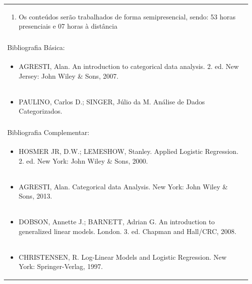 \documentclass[11pt]{article}
\begin{document}
\begin{center}
\begin{longtable}{|p{4cm}|p{4cm}|p{4cm}|p{4cm}|}
\multicolumn{4}{|p{\dimexpr 16cm + 6\tabcolsep\relax}|}{\begin{enumerate}[start=7]\item Os conteúdos serão trabalhados de forma semipresencial, sendo: 53 horas presenciais e 07 horas à distância\end{enumerate}}\\
\multicolumn{4}{|p{\dimexpr 16cm + 6\tabcolsep\relax}|}{}\\
\hline
\multicolumn{4}{|p{16cm}|}{Bibliografia Básica:}\\*
\multicolumn{4}{|p{\dimexpr 16cm + 6\tabcolsep\relax}|}{\begin{itemize}\item AGRESTI, Alan. An introduction to categorical data analysis. 2. ed. New Jersey: John Wiley \& Sons, 2007.\end{itemize}}\\
\multicolumn{4}{|p{\dimexpr 16cm + 6\tabcolsep\relax}|}{\begin{itemize}\item PAULINO, Carlos D.; SINGER, Júlio da M. Análise de Dados Categorizados.\end{itemize}}\\
\multicolumn{4}{|p{16cm}|}{}\\
\hline
\multicolumn{4}{|p{16cm}|}{Bibliografia Complementar:}\\*
\multicolumn{4}{|p{\dimexpr 16cm + 6\tabcolsep\relax}|}{\begin{itemize}\item HOSMER JR, D.W.; LEMESHOW, Stanley. Applied Logistic Regression. 2. ed. New York: John Wiley \& Sons, 2000.\end{itemize}}\\
\multicolumn{4}{|p{\dimexpr 16cm + 6\tabcolsep\relax}|}{\begin{itemize}\item AGRESTI, Alan. Categorical data Analysis. New York: John Wiley \& Sons, 2013.\end{itemize}}\\
\multicolumn{4}{|p{\dimexpr 16cm + 6\tabcolsep\relax}|}{\begin{itemize}\item DOBSON, Annette J.; BARNETT, Adrian G. An introduction to generalized linear models. London. 3. ed. Chapman and Hall/CRC, 2008.\end{itemize}}\\
\multicolumn{4}{|p{\dimexpr 16cm + 6\tabcolsep\relax}|}{\begin{itemize}\item CHRISTENSEN, R. Log-Linear Models and Logistic Regression. New York: Springer-Verlag, 1997.\end{itemize}}\\

\end{longtable}
\end{center}
\end{document}
